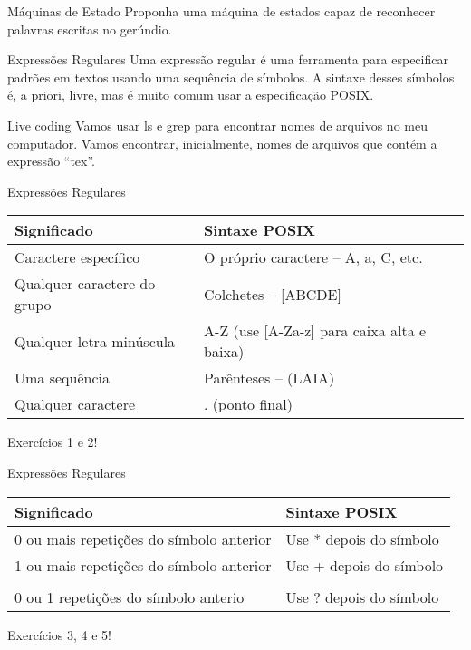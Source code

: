 \documentclass{beamer}
\begin{document}
\begin{frame}{Máquinas de Estado}
  \centering
  \large
  Proponha uma máquina de estados capaz de reconhecer palavras escritas no
  gerúndio.
\end{frame}


\begin{frame}{Expressões Regulares}
  \centering
  \large
  Uma expressão regular é uma ferramenta para especificar padrões em textos
  usando uma sequência de símbolos. A sintaxe desses símbolos é, a priori,
  livre, mas é muito comum usar a especificação POSIX.
\end{frame}

\begin{frame}{Live coding}
  \centering
  \large
  Vamos usar ls e grep para encontrar nomes de arquivos no meu computador. Vamos
  encontrar, inicialmente, nomes de arquivos que contém a expressão ``tex''.
\end{frame}


\begin{frame}[fragile]{Expressões Regulares}
\centering
\large
  \begin{tabular}{p{5cm} | p{5cm} }
    Significado & Sintaxe POSIX \\ \hline
    Caractere específico & O próprio caractere -- A, a, C, etc. \\ \hline
    Qualquer caractere do grupo & Colchetes -- [ABCDE] \\ \hline
    Qualquer letra minúscula & A-Z (use [A-Za-z] para caixa alta e baixa) \\ \hline
    Uma sequência & Parênteses -- (LAIA) \\ \hline
    Qualquer caractere & . (ponto final) \\ \hline
  \end{tabular}

  Exercícios 1 e 2!
\end{frame}

\begin{frame}[fragile]{Expressões Regulares}
  \centering
  \large
  \begin{tabular}{p{5cm} | p{5cm} }
    Significado & Sintaxe POSIX \\ \hline
    0 ou mais repetições do símbolo anterior & Use * depois do símbolo
    \\ \hline
    1 ou mais repetições do símbolo anterior & Use + depois do símbolo \\ \hline
    \\
    0 ou 1 repetições do símbolo anterio & Use ? depois do símbolo \\ \hline
  \end{tabular}

  Exercícios 3, 4 e 5!

\end{frame}
\end{document}
